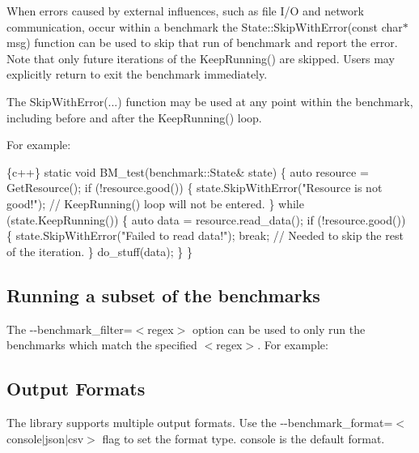 When errors caused by external influences, such as file I/O and network communication, occur within a benchmark the {\ttfamily State\+::\+Skip\+With\+Error(const char$\ast$ msg)} function can be used to skip that run of benchmark and report the error. Note that only future iterations of the {\ttfamily Keep\+Running()} are skipped. Users may explicitly return to exit the benchmark immediately.

The {\ttfamily Skip\+With\+Error(...)} function may be used at any point within the benchmark, including before and after the {\ttfamily Keep\+Running()} loop.

For example\+:


\begin{DoxyCode}
\{c++\}
static void BM\_test(benchmark::State& state) \{
  auto resource = GetResource();
  if (!resource.good()) \{
      state.SkipWithError("Resource is not good!");
      // KeepRunning() loop will not be entered.
  \}
  while (state.KeepRunning()) \{
      auto data = resource.read\_data();
      if (!resource.good()) \{
        state.SkipWithError("Failed to read data!");
        break; // Needed to skip the rest of the iteration.
     \}
     do\_stuff(data);
  \}
\}
\end{DoxyCode}


\subsection*{Running a subset of the benchmarks}

The {\ttfamily -\/-\/benchmark\+\_\+filter=$<$regex$>$} option can be used to only run the benchmarks which match the specified {\ttfamily $<$regex$>$}. For example\+:




\subsection*{Output Formats}

The library supports multiple output formats. Use the {\ttfamily -\/-\/benchmark\+\_\+format=$<$console$\vert$json$\vert$csv$>$} flag to set the format type. {\ttfamily console} is the default format.

